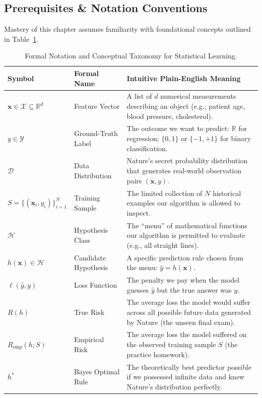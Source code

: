 \subsection{Prerequisites \& Notation Conventions}
Mastery of this chapter assumes familiarity with foundational concepts outlined in Table~\ref{tab:w01_notation}.

\begin{table}[htbp]
\centering
\small
\begin{tabularx}{\textwidth}{llX}
\toprule
\textbf{Symbol} & \textbf{Formal Name} & \textbf{Intuitive Plain-English Meaning} \\
\midrule
$\mathbf{x} \in \mathcal{X} \subseteq \mathbb{R}^d$ & Feature Vector & A list of $d$ numerical measurements describing an object (e.g., patient age, blood pressure, cholesterol). \\
$y \in \mathcal{Y}$ & Ground-Truth Label & The outcome we want to predict: $\mathbb{R}$ for regression; $\{0, 1\}$ or $\{-1, +1\}$ for binary classification. \\
$\mathcal{D}$ & Data Distribution & Nature's secret probability distribution that generates real-world observation pairs $(\mathbf{x}, y)$. \\
$S = \{(\mathbf{x}_i, y_i)\}_{i=1}^N$ & Training Sample & The limited collection of $N$ historical examples our algorithm is allowed to inspect. \\
$\mathcal{H}$ & Hypothesis Class & The ``menu'' of mathematical functions our algorithm is permitted to evaluate (e.g., all straight lines). \\
$h(\mathbf{x}) \in \mathcal{H}$ & Candidate Hypothesis & A specific prediction rule chosen from the menu: $\hat{y} = h(\mathbf{x})$. \\
$\ell(\hat{y}, y)$ & Loss Function & The penalty we pay when the model guesses $\hat{y}$ but the true answer was $y$. \\
$R(h)$ & True Risk & The average loss the model would suffer across all possible future data generated by Nature (the unseen final exam). \\
$R_{\text{emp}}(h; S)$ & Empirical Risk & The average loss the model suffered on the observed training sample $S$ (the practice homework). \\
$h^*$ & Bayes Optimal Rule & The theoretically best predictor possible if we possessed infinite data and knew Nature's distribution perfectly. \\
\bottomrule
\end{tabularx}
\caption{Formal Notation and Conceptual Taxonomy for Statistical Learning.}
\label{tab:w01_notation}
\end{table}

